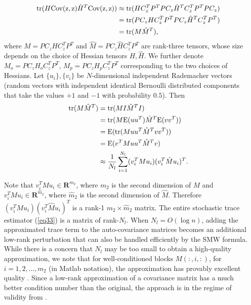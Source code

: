 \documentclass[article,ij4uq]{ij4uq}              %
\begin{document}
\begin{align}
    {\rm{tr}}(H{\rm{Cov(z,z)}}\hat{H}^{T}{\rm{Cov(z,z)}})&\approx{\rm{tr}}(HC_{z}^{T}P^{T}PC_{z}\hat{H}^{T}C_{z}^{T}P^{T}PC_{z})\notag\\
    &={\rm{tr}}(PC_{z}HC_{z}^{T}P^{T}PC_{z}\hat{H}^{T}C_{z}^{T}P^{T})\notag\\
    &={\rm{tr}}(M\hat{M}^{T}),\label{eq32}
\end{align}
where $M=PC_{z}HC_{z}^{T}P^{T}$ and $\hat{M}=PC_{z}\hat{H}C_{z}^{T}P^{T}$ are rank-three tensors, whose size depends on the choice of Hessian tensors $H,\hat{H}$. We further denote $M_{o}=PC_{z}H_{o}C_{z}^{T}P^{T}$, $M_{p}=PC_{z}H_{p}C_{z}^{T}P^{T}$ corresponding to the two choices of Hessians. Let $\{u_{i}\},\{v_{i}\}$ be $N$-dimensional independent Rademacher vectors (random vectors with independent identical Bernoulli distributed components that take the values $+1$ and $-1$ with probability $0.5$). Then
\begin{align}
    {\rm{tr}}(M\hat{M}^{T})&={\rm{tr}}(MI\hat{M}^{T}I)\notag\\
    &={\rm{tr}}(M\mathrm{E}(uu^{T})\hat{M}^{T}\mathrm{E}(vv^{T}))\notag\\
    &=\mathrm{E}({\rm{tr}}(Muu^{T}\hat{M}^{T}vv^{T}))\notag\\
    &=\mathrm{E}(v^{T}Muu^{T}\hat{M}^{T}v)\notag\\
    &\approx\frac{1}{N_{l}}\sum_{i=1}^{N_{l}}(v_{i}^{T}Mu_{i})(v_{i}^{T}\hat{M}u_{i})^{T}.\label{eq33}
\end{align}

\par Note that $v_{i}^{T}Mu_{i}\in\mathbf{R}^{m_2}$, where $m_2$ is the second dimension of $M$ and $v_{i}^{T}Mu_{i}\in\mathbf{R}^{\hat{m}_2}$,
where $\hat{m}_2$ is the second dimension of $\hat{M}$. Therefore $(v_{i}^{T}Mu_{i})(v_{i}^{T}\hat{M}u_{i})^{T}$ is a rank-1 $ m_2 \times \hat{m}_2$ matrix. The entire stochastic trace estimator (\ref{eq33}) is a matrix of rank-$N_{l}$. When $N_{l}=O(\log{n})$, adding the approximated trace term to the auto-covariance matrices becomes an additional low-rank perturbation that can also be handled efficiently by the SMW formula. While there is a concern that $N_l$ may be too small to obtain a high-quality approximation, we note that
for well-conditioned blocks $M(:,i,:)$, for $i=1,2,\ldots,m_2$ (in  Matlab notation), the approximation has provably excellent quality \cite{stein2013stochastic}. Since a low-rank approximation of a covariance matrix has a much better condition number than the original, the approach is in the regime of validity from \cite{stein2013stochastic}.
\end{document}
